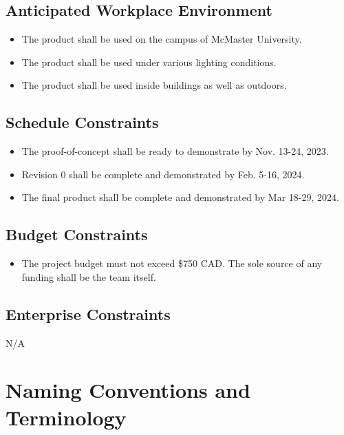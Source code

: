 \documentclass[12pt]{article}
\begin{document}
\subsection{Anticipated Workplace Environment}
\begin{itemize}
  \item The product shall be used on the campus of McMaster University.
  \item The product shall be used under various lighting conditions.
  \item The product shall be used inside buildings as well as outdoors.
\end{itemize}
\subsection{Schedule Constraints}
\begin{itemize}
  \item The proof-of-concept shall be ready to demonstrate by Nov. 13-24, 2023.
  \item Revision 0 shall be complete and demonstrated by Feb. 5-16, 2024.
  \item The final product shall be complete and demonstrated by Mar 18-29, 2024.
\end{itemize}
\subsection{Budget Constraints}
\begin{itemize}
  \item The project budget must not exceed \$750 CAD. The sole source of any funding shall be the team itself. 
\end{itemize}
\subsection{Enterprise Constraints}
N/A
\section{Naming Conventions and Terminology}
\end{document}
